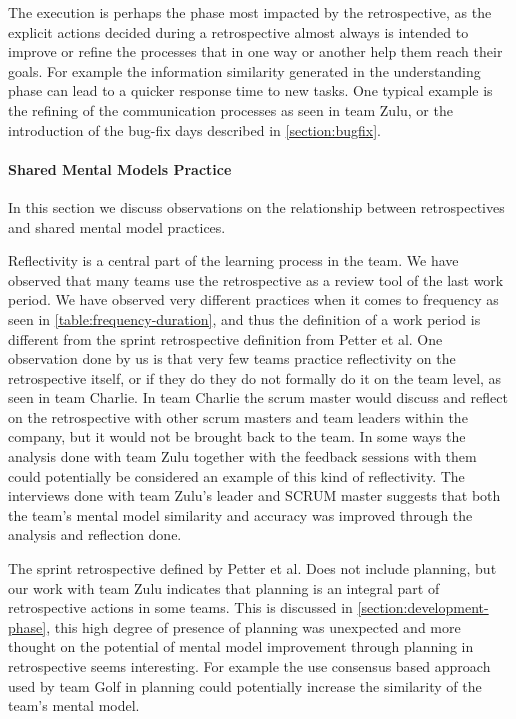 The execution is perhaps the phase most impacted by the retrospective, as the explicit actions decided during a retrospective almost always is intended to improve or refine the processes that in one way or another help them reach their goals. For example the information similarity generated in the understanding phase can lead to a quicker response time to new tasks. One typical example is the refining of the communication processes as seen in team Zulu, or the introduction of the bug-fix days described in \autoref{section:bugfix}. 

\paragraph{Shared Mental Models Practice}
In this section we discuss observations on the relationship between retrospectives and shared mental model practices.

Reflectivity is a central part of the learning process in the team. We have observed that many teams use the retrospective as a review tool of the last work period. We have observed very different practices when it comes to frequency as seen in \autoref{table:frequency-duration}, and thus the definition of a work period is different from the sprint retrospective definition from Petter et al. One observation done by us is that very few teams practice reflectivity on the retrospective itself, or if they do they do not formally do it on the team level, as seen in team Charlie. In team Charlie the scrum master would discuss and reflect on the retrospective with other scrum masters and team leaders within the company, but it would not be brought back to the team. In some ways the analysis done with team Zulu together with the feedback sessions with them could potentially be considered an example of this kind of reflectivity. The interviews done with team Zulu's leader and SCRUM master suggests that both the team's mental model similarity and accuracy was improved through the analysis and reflection done.

The sprint retrospective defined by Petter et al. Does not include planning, but our work with team Zulu indicates that planning is an integral part of retrospective actions in some teams. This is discussed in \autoref{section:development-phase}, this high degree of presence of planning was unexpected and more thought on the potential of mental model improvement through planning in retrospective seems interesting. For example the use consensus based approach used by team Golf in planning could potentially increase the similarity of the team's mental model.

